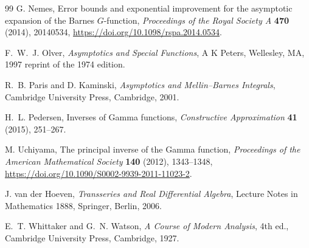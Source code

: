 \documentclass[11pt,oneside]{article}
\theoremstyle{plain}
\theoremstyle{definition}
\theoremstyle{remark}
\begin{document}
\begin{thebibliography}{99}
G. Nemes,
\newblock Error bounds and exponential improvement for the asymptotic
expansion of the Barnes \(G\)-function,
\newblock \emph{Proceedings of the Royal Society A} \textbf{470} (2014),
20140534,
\newblock \url{https://doi.org/10.1098/rspa.2014.0534}.

F.~W.~J. Olver,
\newblock \emph{Asymptotics and Special Functions},
\newblock A K Peters, Wellesley, MA, 1997 reprint of the 1974 edition.

R.~B. Paris and D. Kaminski,
\newblock \emph{Asymptotics and Mellin--Barnes Integrals},
\newblock Cambridge University Press, Cambridge, 2001.

H.~L. Pedersen,
\newblock Inverses of Gamma functions,
\newblock \emph{Constructive Approximation} \textbf{41} (2015), 251--267.

M. Uchiyama,
\newblock The principal inverse of the Gamma function,
\newblock \emph{Proceedings of the American Mathematical Society}
\textbf{140} (2012), 1343--1348,
\newblock \url{https://doi.org/10.1090/S0002-9939-2011-11023-2}.

J. van der Hoeven,
\newblock \emph{Transseries and Real Differential Algebra},
\newblock Lecture Notes in Mathematics 1888, Springer, Berlin, 2006.

E.~T. Whittaker and G.~N. Watson,
\newblock \emph{A Course of Modern Analysis}, 4th ed.,
\newblock Cambridge University Press, Cambridge, 1927.

\end{thebibliography}
\end{document}
